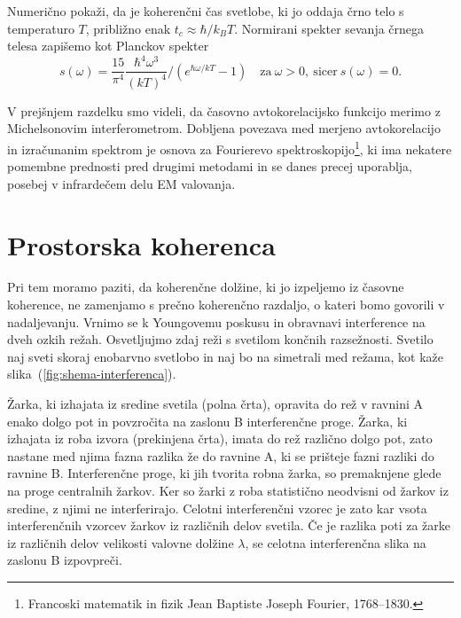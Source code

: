 \begin{definition}\label{naloga-Planck}
Numerično pokaži, da je koherenčni čas svetlobe, ki jo oddaja črno telo s 
temperaturo $T$, približno enak $t_{c}\approx{\hbar}/{k_{B}T}$.
Normirani spekter sevanja črnega telesa zapišemo 
kot Planckov spekter 
\begin{equation}
s(\omega)=\frac{15}{\pi^{4}} \frac{\hbar^4\omega^3}{(kT)^4}/\left(e^{\hbar\omega/kT}-1\right)
\quad \textrm{za}~\omega >0,~\textrm{sicer}~s(\omega) = 0.
\label{eq:Planckov-spekter}
\end{equation}
\end{definition}

\begin{remark}
V prejšnjem razdelku smo videli, da časovno avtokorelacijsko funkcijo
merimo z Michelsonovim interferometrom. Dobljena povezava med merjeno
avtokorelacijo in izračunanim spektrom je osnova za Fourierevo 
spektroskopijo\footnote{Francoski matematik in fizik Jean Baptiste Joseph Fourier, 1768--1830.},
ki ima nekatere pomembne prednosti pred drugimi metodami in se danes
precej uporablja, posebej v infrardečem delu EM valovanja.
\end{remark}

\section{Prostorska koherenca}
\label{Prostorska-koherenca}
Pri tem moramo paziti, da koherenčne dolžine, ki jo izpeljemo iz časovne 
koherence, ne zamenjamo s prečno koherenčno
razdaljo, o kateri bomo govorili v nadaljevanju.
Vrnimo se k Youngovemu poskusu in obravnavi interference
 na dveh ozkih režah. 
Osvetljujmo zdaj reži s svetilom končnih razsežnosti. Svetilo naj sveti skoraj enobarvno
svetlobo in naj bo na simetrali med režama, kot kaže slika~(\ref{fig:shema-interferenca}).

Žarka, ki izhajata iz sredine svetila (polna črta), 
opravita do rež v ravnini A enako dolgo pot in povzročita na zaslonu B 
interferenčne proge. Žarka, ki izhajata iz roba izvora (prekinjena črta), 
imata do rež različno dolgo pot, zato nastane med njima fazna razlika že do ravnine A, 
ki se prišteje fazni razliki do ravnine B. Interferenčne proge, ki jih tvorita 
robna žarka, so premaknjene glede na proge centralnih žarkov. Ker so žarki z roba
statistično neodvisni od žarkov iz sredine, z njimi
ne interferirajo. Celotni interferenčni vzorec je zato kar vsota interferenčnih
vzorcev žarkov iz različnih delov svetila. Če je razlika poti za žarke
iz različnih delov velikosti valovne dolžine $\lambda$, se celotna
interferenčna slika na zaslonu B izpovpreči.

